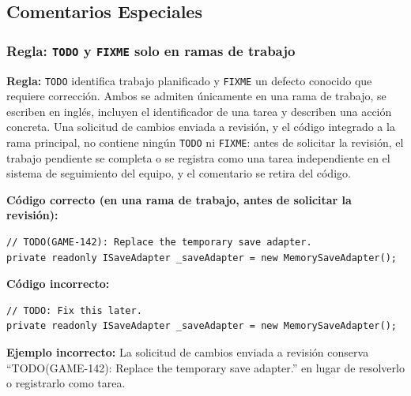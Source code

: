 \subsection{Comentarios Especiales}

\subsubsection{Regla: \texttt{TODO} y \texttt{FIXME} solo en ramas de trabajo}

\textbf{Regla:} \texttt{TODO} identifica trabajo planificado y \texttt{FIXME} un defecto conocido que requiere corrección. Ambos se admiten únicamente en una rama de trabajo, se escriben en inglés, incluyen el identificador de una tarea y describen una acción concreta. Una solicitud de cambios enviada a revisión, y el código integrado a la rama principal, no contiene ningún \texttt{TODO} ni \texttt{FIXME}: antes de solicitar la revisión, el trabajo pendiente se completa o se registra como una tarea independiente en el sistema de seguimiento del equipo, y el comentario se retira del código.

\textbf{Código correcto (en una rama de trabajo, antes de solicitar la revisión):}
\begin{lstlisting}[style=csharpstyle]
// TODO(GAME-142): Replace the temporary save adapter.
private readonly ISaveAdapter _saveAdapter = new MemorySaveAdapter();
\end{lstlisting}

\textbf{Código incorrecto:}
\begin{lstlisting}[style=csharpstyle]
// TODO: Fix this later.
private readonly ISaveAdapter _saveAdapter = new MemorySaveAdapter();
\end{lstlisting}

\textbf{Ejemplo incorrecto:} La solicitud de cambios enviada a revisión conserva ``TODO(GAME-142): Replace the temporary save adapter.'' en lugar de resolverlo o registrarlo como tarea.
